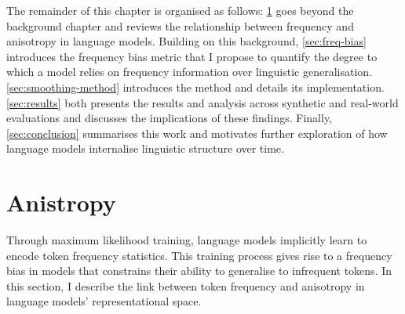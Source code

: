 
The remainder of this chapter is organised as follows: \cref{sec:anisotropy-background} goes beyond the background chapter and reviews the relationship between frequency and anisotropy in language models. Building on this background, \cref{sec:freq-bias} introduces the frequency bias metric that I propose to quantify the degree to which a model relies on frequency information over linguistic generalisation. \cref{sec:smoothing-method} introduces the \smoothing method and details its implementation. \cref{sec:results} both presents the results and analysis across synthetic and real-world evaluations and discusses the implications of these findings. Finally, \cref{sec:conclusion} summarises this work and motivates further exploration of how language models internalise linguistic structure over time.

\section{Anistropy}
\label{sec:anisotropy-background}


Through maximum likelihood training, language models implicitly learn to encode token frequency statistics. This training process gives rise to a frequency bias in models that constrains their ability to generalise to infrequent tokens. In this section, I describe the link between token frequency and anisotropy in language models' representational space.



